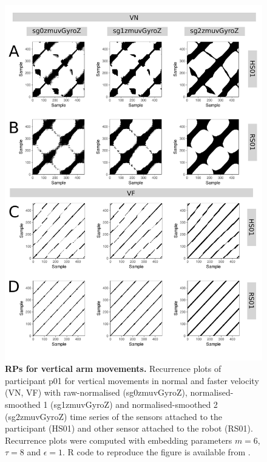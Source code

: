 \begin{figure}[!h]
\centering
\includegraphics[height=0.85\textheight]{rp_aV}
\caption{
	{\bf RPs for vertical arm movements.}	
	Recurrence plots %
	of participant p01 for vertical movements in normal and faster 
	velocity (VN, VF) with raw-normalised (sg0zmuvGyroZ), 
	normalised-smoothed 1 (sg1zmuvGyroZ) and 
	normalised-smoothed 2 (sg2zmuvGyroZ) time series of the 
	sensors attached to the participant (HS01) and other sensor 
	attached to the robot (RS01).
	Recurrence plots were computed with 
	embedding parameters $m=6$, $\tau=8$ and $\epsilon=1$.
	R code to reproduce the figure is available from \cite{hwum2018}.
        }
    \label{fig:rp_aV}
\end{figure}




